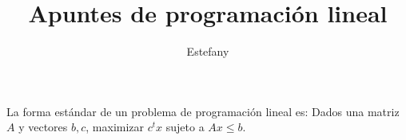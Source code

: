 \documentclass{article}
\title{Apuntes de programación lineal}
\author{Estefany}
\begin{document}
\maketitle
La forma estándar de un problema de programación lineal es:
Dados una matriz $A$ y vectores $b, c$, maximizar $c^tx$ sujeto a
$Ax\leq b$.
\end{document}
